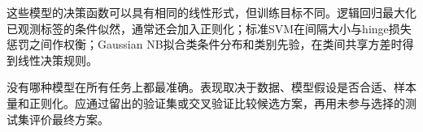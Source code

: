 这些模型的决策函数可以具有相同的线性形式，但训练目标不同。逻辑回归最大化已观测标签的条件似然，通常还会加入正则化；标准SVM在间隔大小与hinge损失惩罚之间作权衡；Gaussian NB拟合类条件分布和类别先验，在类间共享方差时得到线性决策规则。


没有哪种模型在所有任务上都最准确。表现取决于数据、模型假设是否合适、样本量和正则化。应通过留出的验证集或交叉验证比较候选方案，再用未参与选择的测试集评价最终方案。
